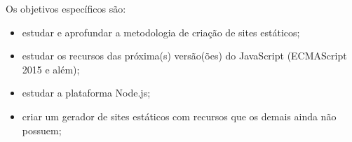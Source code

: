 \documentclass[ppginf, pep]{esinucpel}
\begin{document}
Os objetivos específicos são:
\begin{itemize}
	
	\item estudar e aprofundar a metodologia de criação de sites estáticos;
	\item estudar os recursos das próxima(s) versão(ões) do JavaScript (ECMAScript 2015 e além);
	\item estudar a plataforma Node.js;
    \item criar um gerador de sites estáticos com recursos que os demais ainda não possuem;

\end{itemize}
%
%
%
\end{document}
